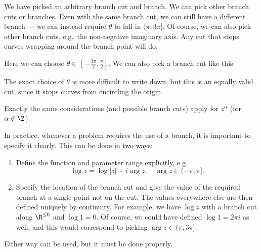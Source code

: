 \documentclass[a4paper]{article}
\begin{document}
We have picked an arbitrary branch cut and branch. We can pick other branch cuts or branches. Even with the same branch cut, we can still have a different branch --- we can instead require $\theta$ to fall in $(\pi, 3\pi]$. Of course, we can also pick other branch cuts, e.g.\ the non-negative imaginary axis. Any cut that stops curves wrapping around the branch point will do.
\begin{center}
\end{center}
Here we can choose $\theta \in \left(-\frac{3\pi}{2}, \frac{\pi}{2}\right]$. We can also pick a branch cut like this:
\begin{center}
\end{center}
The exact choice of $\theta$ is more difficult to write down, but this is an equally valid cut, since it stops curves from encircling the origin.

Exactly the same considerations (and possible branch cuts) apply for $z^\alpha$ (for $\alpha \not\in \Z$).

In practice, whenever a problem requires the use of a branch, it is important to specify it clearly. This can be done in two ways:
\begin{enumerate}
  \item Define the function and parameter range explicitly, e.g.
    \[
      \log z = \log|z| + i \arg z, \quad \arg z \in (-\pi, \pi].
    \]
  \item Specify the location of the branch cut and give the value of the required branch at a single point not on the cut. The values everywhere else are then defined uniquely by continuity. For example, we have $\log z$ with a branch cut along $\R^{\leq 0}$ and $\log 1 = 0$. Of course, we could have defined $\log 1 = 2\pi i$ as well, and this would correspond to picking $\arg z \in (\pi, 3 \pi]$.
\end{enumerate}
Either way can be used, but it must be done properly.
\end{document}
